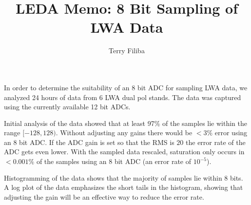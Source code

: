 \documentclass[fleqn, onecolumn]{article}
\begin{document}
\title{LEDA Memo: 8 Bit Sampling of LWA Data}
\date{}
\author{Terry Filiba}
\maketitle

In order to determine the suitability of an 8 bit ADC for sampling LWA data, we analyzed 24 hours of data from 6 LWA dual pol stands. The data was captured using the currently available 12 bit ADCs.


Initial analysis of the data showed that at least 97\% of the samples lie within the range $[-128,128)$. Without adjusting any gains there would be $< 3\%$ error using an 8 bit ADC.
If the ADC gain is set so that the RMS is $20$ the error rate of the ADC gets even lower. With the sampled data rescaled, saturation only occurs in $<0.001\%$ of the samples using an 8 bit ADC (an error rate of $10^{-5}$). 

\begin{table}[h]

\end{table}

Histogramming of the data shows that the majority of samples lie within 8 bits. A log plot of the data emphasizes the short tails in the histogram, showing that adjusting the gain will be an effective way to reduce the error rate. 


\end{document}
